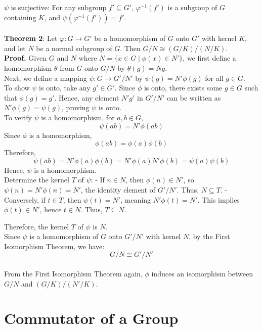    \( \psi \) is surjective: For any subgroup \( f' \subseteq G' \), \( \varphi^{-1}(f') \) is a subgroup of \( G \) containing \( K \), and \( \psi(\varphi^{-1}(f')) = f' \).
\\\\
\textbf{Theorem 2}: Let $\varphi: G \to G'$ be a homomorphism of $G$ onto $G'$ with kernel $K$, and let $N$ be a normal subgroup of $G$. Then $G/N \cong (G/K)/(N/K)$.
\\
\textbf{Proof.}
   Given \(G\) and \(N\) where \(N = \{ x \in G \mid \phi(x) \in N' \}\), we first define a homomorphism \(\theta\) from \(G\) onto \(G/N\) by \(\theta(g) = Ng\).
\\
   Next, we define a mapping \(\psi : G \to G'/N'\) by \(\psi(g) = N'\phi(g)\) for all \(g \in G\).
\\
   To show \(\psi\) is onto, take any \(g' \in G'\). Since \(\phi\) is onto, there exists some \(g \in G\) such that \(\phi(g) = g'\). Hence, any element \(N'g'\) in \(G'/N'\) can be written as \(N'\phi(g) = \psi(g)\), proving \(\psi\) is onto.
\\
   To verify \(\psi\) is a homomorphism, for \(a, b \in G\),
   \[
   \psi(ab) = N'\phi(ab)
   \]
   Since \(\phi\) is a homomorphism,
   \[
   \phi(ab) = \phi(a)\phi(b)
   \]
   Therefore,
   \[
   \psi(ab) = N'\phi(a)\phi(b) = N'\phi(a)N'\phi(b) = \psi(a)\psi(b)
   \]
   Hence, \(\psi\) is a homomorphism.
\\
   Determine the kernel \(T\) of \(\psi\):
   - If \(n \in N\), then \(\phi(n) \in N'\), so \(\psi(n) = N'\phi(n) = N'\), the identity element of \(G'/N'\). Thus, \(N \subseteq T\).
   - Conversely, if \(t \in T\), then \(\psi(t) = N'\), meaning \(N'\phi(t) = N'\). This implies \(\phi(t) \in N'\), hence \(t \in N\). Thus, \(T \subseteq N\).

   Therefore, the kernel \(T\) of \(\psi\) is \(N\).
\\
   Since \(\psi\) is a homomorphism of \(G\) onto \(G'/N'\) with kernel \(N\), by the First Isomorphism Theorem, we have:
   \[
   G/N \cong G'/N'
   \]
\\
   From the First Isomorphism Theorem again, \(\phi\) induces an isomorphism between \(G/N\) and \((G/K)/(N'/K)\).
\\
\section{Commutator of a Group}

